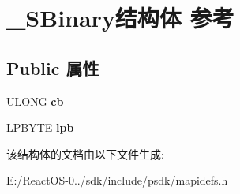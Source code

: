 \hypertarget{struct___s_binary}{}\section{\+\_\+\+S\+Binary结构体 参考}
\label{struct___s_binary}
\subsection*{Public 属性}
\begin{DoxyCompactItemize}
\item 
\mbox{\label{struct___s_binary_af15d770f2e657fcc6b5dae8d0cd707d1}} 
U\+L\+O\+NG {\bfseries cb}
\item 
\mbox{\label{struct___s_binary_a3cdd6ef2a1d67f812cfd9391611e9544}} 
L\+P\+B\+Y\+TE {\bfseries lpb}
\end{DoxyCompactItemize}


该结构体的文档由以下文件生成\+:\begin{DoxyCompactItemize}
\item 
E\+:/\+React\+O\+S-\/0../sdk/include/psdk/mapidefs.\+h\end{DoxyCompactItemize}
